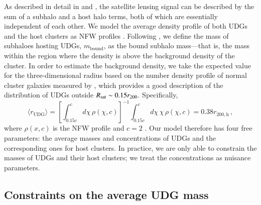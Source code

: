 \documentclass[usenatbib,fleqn]{mnras}
\begin{document}
As described in detail in \cite{yang06} and \cite{sifon15_kids}, the satellite lensing signal can be described by the sum of a subhalo and a host halo terms, both of which are essentially independent of each other. We model the average density profile of both UDGs and the host clusters as NFW profiles \citep{nfw95}.
%
Following \cite{sifon17}, we define the mass of subhaloes hosting UDGs, $m_\mathrm{bound}$, as the bound subhalo mass---that is, the mass within the region where the density is above the background density of the cluster. In order to estimate the background density, we take the expected value for the three-dimensional radius based on the number density profile of normal cluster galaxies measured by \cite{vdburg15}, which provides a good description of the distribution of UDGs outside $R_\mathrm{sat}\sim0.15r_{200}$. Specifically,
\begin{equation}
 \langle r_\mathrm{UDG} \rangle = 
  \left[\int_{0.15c}^c d\chi\,\rho(\chi, c)\right]^{-1}
    \int_{0.15c}^c d\chi\,\chi\,\rho(\chi, c) = 0.38r_\mathrm{200,h}\,,
\end{equation}
where $\rho(x, c)$ is the NFW profile and $c=2$ \citep{vdburg15,vdburg16}.
Our model therefore has four free parameters: the average masses and concentrations of UDGs and the corresponding ones for host clusters. In practice, we are only able to constrain the masses of UDGs and their host clusters; we treat the concentrations as nuisance parameters. 


\subsection{Constraints on the average UDG mass}
\end{document}
